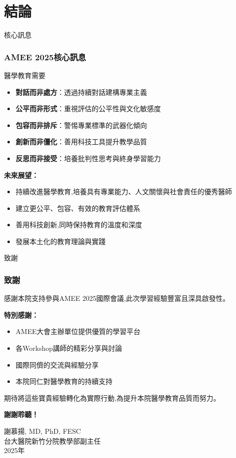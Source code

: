 \documentclass[aspectratio=169]{beamer}
\begin{document}
\section{結論}

\begin{frame}{核心訊息}
\frametitle{AMEE 2025核心訊息}

\begin{block}{醫學教育需要}
\begin{itemize}
    \item \textbf{對話而非處方}：透過持續對話建構專業主義
    \item \textbf{公平而非形式}：重視評估的公平性與文化敏感度
    \item \textbf{包容而非排斥}：警惕專業標準的武器化傾向
    \item \textbf{創新而非僵化}：善用科技工具提升教學品質
    \item \textbf{反思而非接受}：培養批判性思考與終身學習能力
\end{itemize}
\end{block}

\vspace{0.5cm}

\textbf{未來展望：}
\begin{itemize}
    \item 持續改進醫學教育,培養具有專業能力、人文關懷與社會責任的優秀醫師
    \item 建立更公平、包容、有效的教育評估體系
    \item 善用科技創新,同時保持教育的溫度和深度
    \item 發展本土化的教育理論與實踐
\end{itemize}
\end{frame}

\begin{frame}{致謝}
\frametitle{致謝}

感謝本院支持參與AMEE 2025國際會議,此次學習經驗豐富且深具啟發性。

\vspace{0.5cm}

\textbf{特別感謝：}
\begin{itemize}
    \item AMEE大會主辦單位提供優質的學習平台
    \item 各Workshop講師的精彩分享與討論
    \item 國際同儕的交流與經驗分享
    \item 本院同仁對醫學教育的持續支持
\end{itemize}

\vspace{0.5cm}

期待將這些寶貴經驗轉化為實際行動,為提升本院醫學教育品質而努力。

\vspace{1cm}

\begin{center}
\Large
\textbf{謝謝聆聽！}


\normalsize
謝慕揚, MD, PhD, FESC\\
台大醫院新竹分院教學部副主任\\
2025年
\end{center}
\end{frame}
\end{document}
